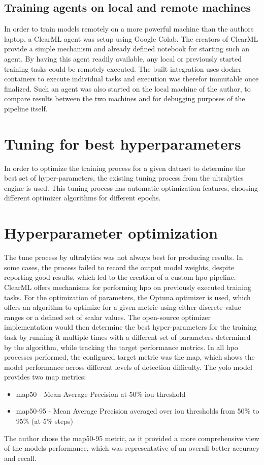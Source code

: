 \documentclass[Bachelor, BIC, english, fhCitStyle, IEEE]{BASE/twbook} %
\begin{document}
\subsection{Training agents on local and remote machines}
In order to train models remotely on a more powerful machine than the authors laptop, a ClearML agent was setup using Google Colab. The creators of ClearML provide a simple mechanism and already defined notebook for starting such an agent. By having this agent readily available, any local or previously started training tasks could be remotely executed. The built integration uses docker containers to execute individual tasks and execution was therefor immutable once finalized. Such an agent was also started on the local machine of the author, to compare results between the two machines and for debugging purposes of the pipeline itself.
\section{Tuning for best hyperparameters}
In order to optimize the training process for a given dataset to determine the best set of hyper-parameters, the existing tuning process from the ultralytics engine is used. This tuning process has automatic optimization features, choosing different optimizer algorithms for different epochs.
\section{Hyperparameter optimization}
The tune process by ultralytics was not always best for producing results. In some cases, the process failed to record the output model weights, despite reporting good results, which led to the creation of a custom \ac{hpo} pipeline.\\
ClearML offers mechanisms for performing \ac{hpo} on previously executed training tasks. For the optimization of parameters, the Optuna optimizer is used, which offers an algorithm to optimize for a given metric using either discrete value ranges or a defined set of scalar values. The open-source optimizer implementation would then determine the best hyper-parameters for the training task by running it multiple times with a different set of parameters determined by the algorithm, while tracking the target performance metrics. In all \ac{hpo} processes performed, the configured target metric was the \ac{map}, which shows the model performance across different levels of detection difficulty. The \ac{yolo} model provides two \ac{map} metrics:
\begin{itemize}
    \item \ac{map}50 - Mean Average Precision at 50\% \ac{iou} threshold
    \item \ac{map}50-95 - Mean Average Precision averaged over \ac{iou} thresholds from 50\% to 95\% (at 5\% steps)
\end{itemize}
The author chose the \ac{map}50-95 metric, as it provided a more comprehensive view of the models performance, which was representative of an overall better accuracy and recall.
\clearpage
\end{document}
